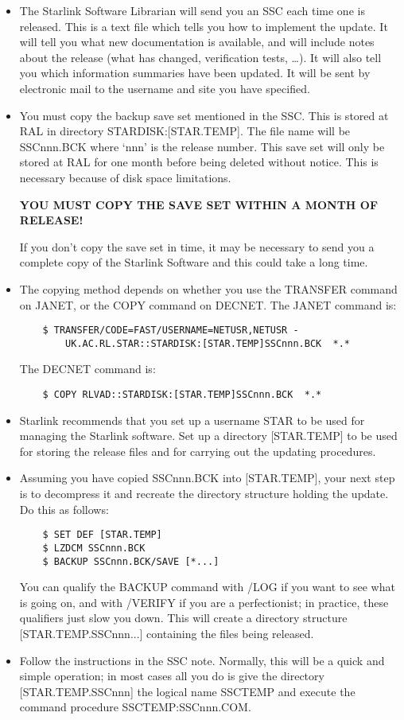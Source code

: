 \begin{itemize}
\item The Starlink Software Librarian will send you an SSC each time one is
released.
This is a text file which tells you how to implement the update.
It will tell you what new documentation is available, and will include notes
about the release (what has changed, verification tests, \ldots).
It will also tell you which information summaries have been updated.
It will be sent by electronic mail to the username and site you have specified.
\item You must copy the backup save set mentioned in the SSC. 
This is stored at RAL in directory STARDISK:[STAR.TEMP].
The file name will be SSCnnn.BCK where `nnn' is the release number.
This save set will only be stored at RAL for one month before being deleted
without notice.
This is necessary because of disk space limitations.

{\bf YOU MUST COPY THE SAVE SET WITHIN A MONTH OF RELEASE!}

If you don't copy the save set in time, it may be necessary to send you a
complete copy of the Starlink Software and this could take a long time.
\item The copying method depends on whether you use the TRANSFER command on
JANET, or the COPY command on DECNET.
The JANET command is:
\begin{verbatim}
    $ TRANSFER/CODE=FAST/USERNAME=NETUSR,NETUSR -
        UK.AC.RL.STAR::STARDISK:[STAR.TEMP]SSCnnn.BCK  *.*
\end{verbatim}
The DECNET command is:
\begin{verbatim}
    $ COPY RLVAD::STARDISK:[STAR.TEMP]SSCnnn.BCK  *.*
\end{verbatim}
\item Starlink recommends that you set up a username STAR to be used for
managing the Starlink software.
Set up a directory [STAR.TEMP] to be used for storing the release files and
for carrying out the updating procedures.
\item Assuming you have copied SSCnnn.BCK into [STAR.TEMP], your next step is
to decompress it and recreate the directory structure holding the update.
Do this as follows:
\begin{verbatim}
    $ SET DEF [STAR.TEMP]
    $ LZDCM SSCnnn.BCK	
    $ BACKUP SSCnnn.BCK/SAVE [*...]
\end{verbatim}
You can qualify the BACKUP command with /LOG if you want to see what is going
on, and with /VERIFY if you are a perfectionist; in practice, these qualifiers
just slow you down.
This will create a directory structure [STAR.TEMP.SSCnnn...] containing the
files being released.
\item Follow the instructions in the SSC note. 
Normally, this will be a quick and simple operation; in most cases all you do is
give the directory [STAR.TEMP.SSCnnn] the logical name SSCTEMP and execute the
command procedure SSCTEMP:SSCnnn.COM.
\end{itemize}
